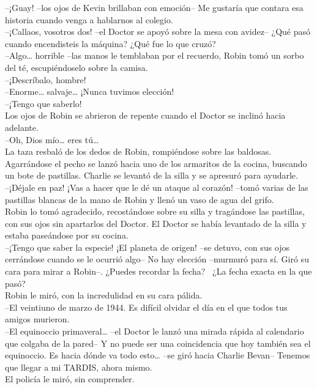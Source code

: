 --¡Guay! --los ojos de Kevin brillaban con emoción-- Me gustaría que
contara esa historia cuando venga a hablarnos al colegio.\\
--¡Callaos, vosotros dos! --el Doctor se apoyó sobre la mesa con
avidez-- ¿Qué pasó cuando encendisteis la máquina? ¿Qué fue lo que
cruzó?\\
--Algo\ldots{} horrible --las manos le temblaban por el recuerdo, Robin
tomó un sorbo del té, escupiéndoselo sobre la camisa.\\
--¡Descríbalo, hombre!\\
--Enorme\ldots{} salvaje\ldots{} ¡Nunca tuvimos elección!\\
--¡Tengo que saberlo!\\
Los ojos de Robin se abrieron de repente cuando el Doctor se inclinó
hacia adelante.\\
--Oh, Dios mío\ldots{} eres tú\ldots{}\\
La taza resbaló de los dedos de Robin, rompiéndose sobre las baldosas.
Agarrándose el pecho se lanzó hacia uno de los armaritos de la cocina,
buscando un bote de pastillas. Charlie se levantó de la silla y se
apresuró para ayudarle.\\
--¡Déjale en paz! ¡Vas a hacer que le dé un ataque al corazón! --tomó
varias de las pastillas blancas de la mano de Robin y llenó un vaso de
agua del grifo.\\
Robin lo tomó agradecido, recostándose sobre su silla y tragándose las
pastillas, con sus ojos sin apartarlos del Doctor. El Doctor se había
levantado de la silla y estaba paseándose por su cocina.\\
--¡Tengo que saber la especie! ¡El planeta de origen! --se detuvo, con
sus ojos cerrándose cuando se le ocurrió algo-- No hay elección
--murmuró para sí. Giró su cara para mirar a Robin--. ¿Puedes recordar
la fecha? ~¿La fecha exacta en la que pasó?\\
Robin le miró, con la incredulidad en su cara pálida.\\
--El veintiuno de marzo de 1944. Es difícil olvidar el día en el que
todos tus amigos murieron.\\
--El equinoccio primaveral\ldots{} --el Doctor le lanzó una mirada
rápida al calendario que colgaba de la pared-- Y no puede ser una
coincidencia que hoy también sea el equinoccio. Es hacia dónde va todo
esto\ldots{} --se giró hacia Charlie Bevan-- Tenemos que llegar a mi
TARDIS, ahora mismo.\\
El policía le miró, sin comprender.\\
